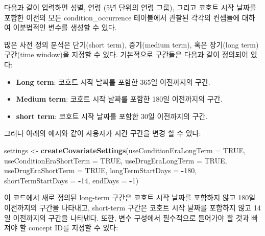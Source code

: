 \documentclass[11pt]{book}
\newenvironment{Shaded}{\begin{snugshade}}{\end{snugshade}}
\newcommand{\KeywordTok}[1]{\textcolor[rgb]{0.13,0.29,0.53}{\textbf{#1}}}
\newcommand{\DataTypeTok}[1]{\textcolor[rgb]{0.13,0.29,0.53}{#1}}
\newcommand{\DecValTok}[1]{\textcolor[rgb]{0.00,0.00,0.81}{#1}}
\newcommand{\StringTok}[1]{\textcolor[rgb]{0.31,0.60,0.02}{#1}}
\newcommand{\OtherTok}[1]{\textcolor[rgb]{0.56,0.35,0.01}{#1}}
\newcommand{\OperatorTok}[1]{\textcolor[rgb]{0.81,0.36,0.00}{\textbf{#1}}}
\newcommand{\NormalTok}[1]{#1}
\providecommand{\tightlist}{%
  \setlength{\itemsep}{0pt}\setlength{\parskip}{0pt}}
\theoremstyle{definition}
\theoremstyle{definition}
\theoremstyle{definition}
\theoremstyle{remark}
\begin{document}
다음과 같이 입력하면 성별, 연령 (5년 단위의 연령 그룹), 그리고 코호트
시작 날짜를 포함한 이전의 모든 condition\_occurrence 테이블에서 관찰된
각각의 컨셉들에 대하여 이분법적인 변수를 생성할 수 있다.

많은 사전 정의 분석은 단기(short term), 중기(medium term), 혹은
장기(long term) 구간(time window)을 지정할 수 있다. 기본적으로 구간들은
다음과 같이 정의되어 있다:

\begin{itemize}
\tightlist
\item
  \textbf{Long term}: 코호트 시작 날짜를 포함한 365일 이전까지의 구간.
\item
  \textbf{Medium term}: 코호트 시작 날짜를 포함한 180일 이전까지의 구간.
\item
  \textbf{short term}: 코호트 시작 날짜를 포함한 30일 이전까지의 구간.
\end{itemize}

그러나 아래의 예시와 같이 사용자가 시간 구간을 변경 할 수 있다:

\begin{Shaded}
\begin{Highlighting}[]
\NormalTok{settings <-}\StringTok{ }\KeywordTok{createCovariateSettings}\NormalTok{(}\DataTypeTok{useConditionEraLongTerm =} \OtherTok{TRUE}\NormalTok{, }
                                    \DataTypeTok{useConditionEraShortTerm =} \OtherTok{TRUE}\NormalTok{, }
                                    \DataTypeTok{useDrugEraLongTerm =} \OtherTok{TRUE}\NormalTok{,}
                                    \DataTypeTok{useDrugEraShortTerm =} \OtherTok{TRUE}\NormalTok{, }
                                    \DataTypeTok{longTermStartDays =} \OperatorTok{-}\DecValTok{180}\NormalTok{, }
                                    \DataTypeTok{shortTermStartDays =} \OperatorTok{-}\DecValTok{14}\NormalTok{, }
                                    \DataTypeTok{endDays =} \OperatorTok{-}\DecValTok{1}\NormalTok{) }
\end{Highlighting}
\end{Shaded}

이 코드에서 새로 정의된 long-term 구간은 코호트 시작 날짜를 포함하지
않고 180일 이전까지의 구간을 나타내고, short-term 구간은 코호트 시작
날짜를 포함하지 않고 14일 이전까지의 구간을 나타낸다. 또한, 변수
구성에서 필수적으로 들어가야 할 것과 빠져야 할 concept ID를 지정할 수
있다:
\end{document}
